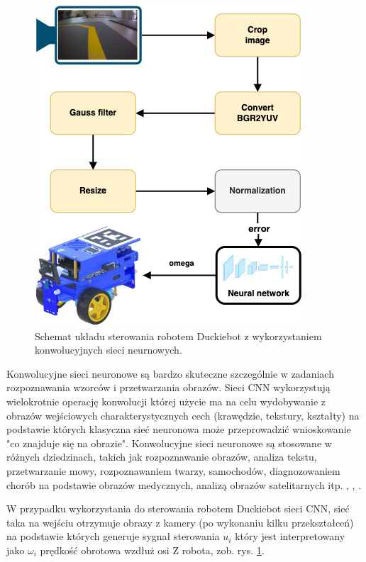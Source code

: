\documentclass[conference]{IEEEtran}
\begin{document}
\begin{figure}[h]
    \centering
    \includegraphics[width=.8\columnwidth]{NNPipeline3}
    \caption{Schemat układu sterowania robotem Duckiebot z wykorzystaniem konwolucyjnych sieci neurnowych.}
    \label{fig:cnn-pipeline}
\end{figure}

Konwolucyjne sieci neuronowe są bardzo skuteczne szczególnie w zadaniach rozpoznawania wzorców i przetwarzania obrazów. Sieci CNN wykorzystują wielokrotnie operację konwolucji której użycie ma na celu wydobywanie z obrazów wejściowych charakterystycznych cech (krawędzie, tekstury, kształty) na podstawie których klasyczna sieć neuronowa może przeprowadzić wnioskowanie "co znajduje się na obrazie". Konwolucyjne sieci neuronowe są  stosowane w różnych dziedzinach, takich jak rozpoznawanie obrazów, analiza tekstu, przetwarzanie mowy, rozpoznawaniem twarzy, samochodów, diagnozowaniem chorób na podstawie obrazów medycznych, analizą obrazów satelitarnych itp. \cite{li2021survey}, \cite{rawat2017deep}, \cite{almasi2020robust}.

W przypadku wykorzystania do sterowania robotem Duckiebot sieci CNN, sieć taka na wejściu otrzymuje obrazy z kamery (po wykonaniu kilku przekształceń) na podstawie których generuje sygnał sterowania $u_i$ który jest interpretowany jako  $\omega_i$ prędkość obrotowa wzdłuż osi Z robota, zob. rys. \ref{fig:cnn-pipeline}.
\end{document}
